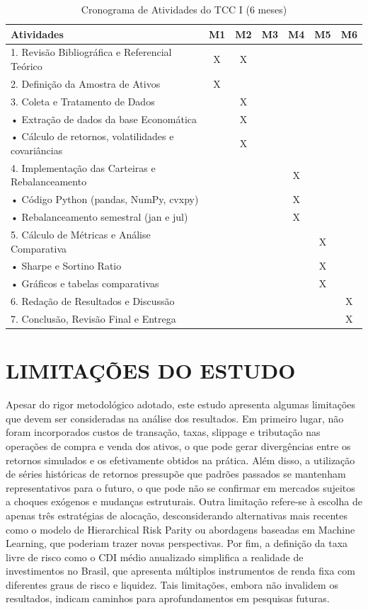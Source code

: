 \begin{table}[h]
\centering
\caption{Cronograma de Atividades do TCC I (6 meses)}
\scriptsize
\begin{tabular}{|p{4.5cm}|*{6}{c|}}
\hline
\textbf{Atividades} & \textbf{M1} & \textbf{M2} & \textbf{M3} & \textbf{M4} & \textbf{M5} & \textbf{M6} \\
\hline
1. Revisão Bibliográfica e Referencial Teórico & X & X & & & & \\
\hline
2. Definição da Amostra de Ativos & X & & & & & \\
\hline
3. Coleta e Tratamento de Dados & & X & & & & \\
\hline
\quad • Extração de dados da base Economática & & X & & & & \\
\hline
\quad • Cálculo de retornos, volatilidades e covariâncias & & X & & & & \\
\hline
4. Implementação das Carteiras e Rebalanceamento & & & & X & & \\
\hline
\quad • Código Python (pandas, NumPy, cvxpy) & & & & X & & \\
\hline
\quad • Rebalanceamento semestral (jan e jul) & & & & X & & \\
\hline
5. Cálculo de Métricas e Análise Comparativa & & & & & X & \\
\hline
\quad • Sharpe e Sortino Ratio & & & & & X & \\
\hline
\quad • Gráficos e tabelas comparativas & & & & & X & \\
\hline
6. Redação de Resultados e Discussão & & & & & & X \\
\hline
7. Conclusão, Revisão Final e Entrega & & & & & & X \\
\hline
\end{tabular}
\normalsize
\label{tab:cronograma}
\end{table}

\section{LIMITAÇÕES DO ESTUDO}

Apesar do rigor metodológico adotado, este estudo apresenta algumas limitações que devem ser consideradas na análise dos resultados. Em primeiro lugar, não foram incorporados custos de transação, taxas, slippage e tributação nas operações de compra e venda dos ativos, o que pode gerar divergências entre os retornos simulados e os efetivamente obtidos na prática. Além disso, a utilização de séries históricas de retornos pressupõe que padrões passados se mantenham representativos para o futuro, o que pode não se confirmar em mercados sujeitos a choques exógenos e mudanças estruturais. Outra limitação refere-se à escolha de apenas três estratégias de alocação, desconsiderando alternativas mais recentes como o modelo de Hierarchical Risk Parity ou abordagens baseadas em Machine Learning, que poderiam trazer novas perspectivas. Por fim, a definição da taxa livre de risco como o CDI médio anualizado simplifica a realidade de investimentos no Brasil, que apresenta múltiplos instrumentos de renda fixa com diferentes graus de risco e liquidez. Tais limitações, embora não invalidem os resultados, indicam caminhos para aprofundamentos em pesquisas futuras.